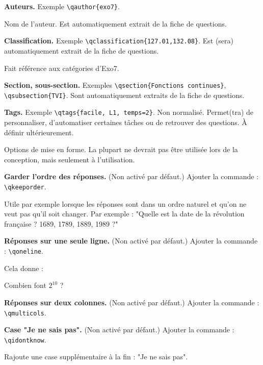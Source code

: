\documentclass[12pt,a4paper]{article}
\begin{document}
\bigskip
\textbf{Auteurs.} Exemple \verb|\qauthor{exo7}|. 

Nom de l'auteur. Est automatiquement extrait de la fiche de questions.

\bigskip
\textbf{Classification.} Exemple \verb|\qclassification{127.01,132.08}|. Est (sera) automatiquement extrait de la fiche de questions.

Fait référence aux catégories d'Exo7.

\bigskip
\textbf{Section, sous-section.} Exemples \verb|\qsection{Fonctions continues}|, \verb|\qsubsection{TVI}|. Sont  automatiquement extraits de la fiche de questions.


\bigskip
\textbf{Tags.} Exemple \verb|\qtags{facile, L1, temps=2}|. Non normalisé. Permet(tra) de personnaliser, d'automatiser certaines tâches ou de retrouver des questions. À définir ultérieurement.

\bigskip

Options de mise en forme. La plupart ne devrait pas être utilisée lors de la conception, mais seulement à l'utilisation.

\bigskip
\textbf{Garder l'ordre des réponses.} (Non activé par défaut.) Ajouter la commande : \verb|\qkeeporder|. 

Utile par exemple lorsque les réponses sont dans un ordre naturel et qu'on ne veut pas qu'il soit changer. Par exemple : "Quelle est la date de la révolution française ? 1689, 1789, 1889, 1989 ?" 


\bigskip
\textbf{Réponses sur une seule ligne.} (Non activé par défaut.) Ajouter la commande : \verb|\qoneline|.

Cela donne :
\begin{center}
\begin{minipage}{0.8\textwidth}
\begin{question}
\qoneline
Combien font $2^{10}$ ?
\begin{answers}
\end{answers}
\end{question}
\end{minipage}
\end{center}

\bigskip
\textbf{Réponses sur deux colonnes.} (Non activé par défaut.) Ajouter la commande : \verb|\qmulticols|.

\bigskip
\textbf{Case "Je ne sais pas".} (Non activé par défaut.) Ajouter la commande : \verb|\qidontknow|. 

Rajoute une case supplémentaire à la fin : "Je ne sais pas".
\end{document}
